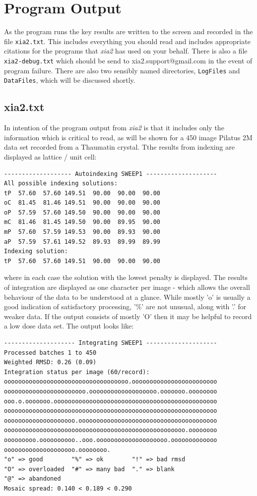 \documentclass[a4paper, 11pt]{article}
\begin{document}
\section{Program Output}

As the program runs the key results are written to the screen and recorded
in the file \verb|xia2.txt|. This includes everything you should read and
includes appropriate citations for the programs that \emph{xia2} has used
on your behalf. There is also a file \verb|xia2-debug.txt| 
which should be send to 
xia2.support@gmail.com in the event of program failure. There are also two 
sensibly named directories, \verb|LogFiles| and \verb|DataFiles|, which will
be discussed shortly.

\subsection{xia2.txt}

In intention of the program output from \emph{xia2} is that it includes only
the information which is critical to read, as will be shown for a 450 image 
Pilatus 2M data set recorded from a Thaumatin crystal. Tthe results from 
indexing are displayed as lattice / unit cell:

{\small
\begin{verbatim}
------------------- Autoindexing SWEEP1 --------------------
All possible indexing solutions:
tP  57.60  57.60 149.51  90.00  90.00  90.00
oC  81.45  81.46 149.51  90.00  90.00  90.00
oP  57.59  57.60 149.50  90.00  90.00  90.00
mC  81.46  81.45 149.50  90.00  89.95  90.00
mP  57.60  57.59 149.53  90.00  89.93  90.00
aP  57.59  57.61 149.52  89.93  89.99  89.99
Indexing solution:
tP  57.60  57.60 149.51  90.00  90.00  90.00
\end{verbatim}
}

\noindent
where in each case the solution with the lowest penalty is displayed. The 
results of integration are displayed as one character per image - which 
allows the overall behaviour of the data to be understood at a glance. While
mostly 'o' is usually a good indication of satisfactory processing, '\%'
are not unusual, along with '.' for weaker data. If the output consists
of mostly 'O' then it may be helpful to record a low dose data set. The output
looks like:

{\small
\begin{verbatim}
-------------------- Integrating SWEEP1 --------------------
Processed batches 1 to 450
Weighted RMSD: 0.26 (0.09)
Integration status per image (60/record):
ooooooooooooooooooooooooooooooooooo.oooooooooooooooooooooooo
ooooooooooooooooooooooo.ooooooooooooooooooo.ooooooo.oooooooo
ooo.o.ooooooo.oooooooooooooooooooooooooooooooooooooooooooooo
oooooooooooooooooooooooooooooooooooooooooooooooooooooooooooo
oooooooooooooooooooo.ooooooooooooooooooooooooooooooooooooooo
ooooooooooooooooooooooooooooooooooooooooooooooooooo.oooooooo
ooooooooo.oooooooooo..ooo.oooooooooooooooooooo.ooooooooooooo
oooooooooooooooooooo.oooooooo.
"o" => good        "%" => ok        "!" => bad rmsd
"O" => overloaded  "#" => many bad  "." => blank
"@" => abandoned
Mosaic spread: 0.140 < 0.189 < 0.290
\end{verbatim}
}
\end{document}
